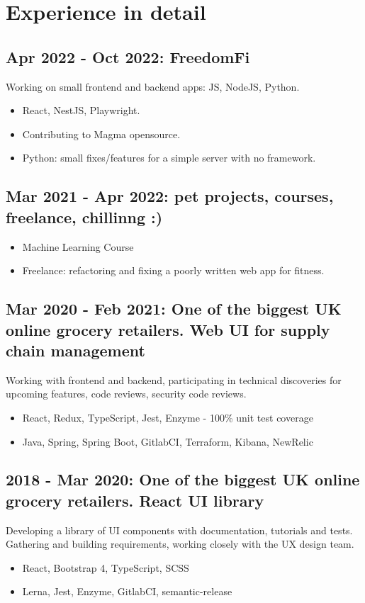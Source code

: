 \documentclass[a4paper, 14pt]{article}
\begin{document}
\section{Experience in detail}
  \subsection{Apr 2022 - Oct 2022: FreedomFi}
    Working on small frontend and backend apps: JS, NodeJS, Python.
    \begin{itemize}
      \item React, NestJS, Playwright. \\
      \item Contributing to Magma opensource. \\
      \item Python: small fixes/features for a simple server with no framework.
    \end{itemize}
  \subsection{Mar 2021 - Apr 2022: pet projects, courses, freelance, chillinng :)}
    \begin{itemize}
      \item Machine Learning Course \\
      \item Freelance: refactoring and fixing a poorly written web app for fitness.
    \end{itemize}
  \subsection{Mar 2020 - Feb 2021: One of the biggest UK online grocery retailers. Web UI for supply chain management}
  Working with frontend and backend, participating in technical discoveries for upcoming features, code reviews, security code reviews.
    \begin{itemize}
      \item React, Redux, TypeScript, Jest, Enzyme - 100\% unit test coverage \\
      \item Java, Spring, Spring Boot, GitlabCI, Terraform, Kibana, NewRelic
    \end{itemize}
  \subsection{2018 - Mar 2020: One of the biggest UK online grocery retailers. React UI library}
    Developing a library of UI components with documentation, tutorials and tests. \\
    Gathering and building requirements, working closely with the UX design team.
    \begin{itemize}
      \item React, Bootstrap 4, TypeScript, SCSS \\ 
      \item Lerna, Jest, Enzyme, GitlabCI, semantic-release
    \end{itemize}
\end{document}
